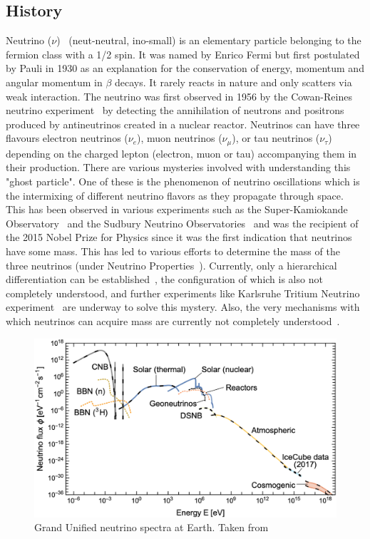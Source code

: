 \subsection{History}
Neutrino ($\nu$)~\cite{10.1063/1.2995181} (neut-neutral, ino-small) is an elementary particle belonging to the fermion class with a 1/2 spin. It was named by Enrico Fermi but first postulated by Pauli in 1930 as an explanation for the conservation of energy, momentum and angular momentum in $\beta$ decays. It rarely reacts in nature and only scatters via weak interaction. The neutrino was first observed in 1956 by the Cowan-Reines neutrino experiment~\cite{PhysRev.92.830} by detecting the annihilation of neutrons and positrons produced by antineutrinos created in a nuclear reactor. Neutrinos can have three flavours electron neutrinos ($\nu_e$), muon neutrinos ($\nu_{\mu}$), or tau neutrinos ($\nu_{\tau}$) depending on the charged lepton (electron, muon or tau) accompanying them in their production. There are various mysteries involved with understanding this "ghost particle". One of these is the phenomenon of neutrino oscillations which is the intermixing of different neutrino flavors as they propagate through space. This has been observed in various experiments such as the Super-Kamiokande Observatory~\cite{Fukuda_1998} and the Sudbury Neutrino Observatories~\cite{BELLERIVE201630} and was the recipient of the 2015 Nobel Prize for Physics since it was the first indication that neutrinos have some mass. This has led to various efforts to determine the mass of the three neutrinos (under Neutrino Properties~\cite{ParticleDataGroup:2024cfk}). Currently, only a hierarchical differentiation can be established~\cite{Qian_2015}, the configuration of which is also not completely understood, and further experiments like Karlsruhe Tritium Neutrino experiment~\cite{aker2024directneutrinomassmeasurementbased} are underway to solve this mystery. Also, the very mechanisms with which neutrinos can acquire mass are currently not completely understood~\cite{CERN_courier_nu_mass}. 
\begin{figure}[t!]
  \centering
  \includegraphics[width=14.5cm]{thesis_figures/CRnNu/Neutrino spectra.jpg}
  \caption{Grand Unified neutrino spectra at Earth. Taken from ~\cite{Vitagliano:2019yzm}}
  \label{fig:Neutrino-spectra}
\end{figure}

